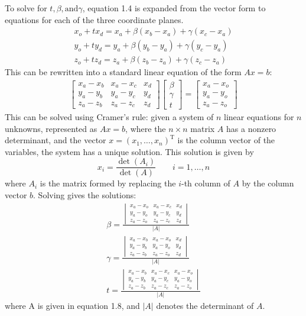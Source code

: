 To solve for $t, \beta, \text{and} \gamma$, equation 1.4 is expanded from the vector form to equations for each of the three coordinate planes.
\begin{align}
x_o + tx_d = x_a + \beta(x_b-x_a) + \gamma(x_c-x_a) \\
y_o + ty_d = y_a + \beta(y_b-y_a) + \gamma(y_c-y_a) \\
z_o + tz_d = z_a + \beta(z_b-z_a) + \gamma(z_c-z_a)
\end{align}
This can be rewritten into a standard linear equation of the form $Ax = b$:
\begin{align}
\begin{bmatrix}
x_a - x_b & x_a - x_c & x_d \\
y_a - y_b & y_a - y_c & y_d \\
z_a - z_b & z_a - z_c & z_d
\end{bmatrix}
\begin{bmatrix}
\beta \\ \gamma \\ t
\end{bmatrix}
= \begin{bmatrix}
x_a - x_o \\ y_a - y_o \\ z_a - z_o
\end{bmatrix}
\end{align}
This can be solved using Cramer's rule: given a system of $n$ linear equations for $n$ unknowns, represented as $Ax = b$, where the $n \times n$ matrix $A$ has a nonzero determinant, and the vector $x = (x_1, \ldots, x_n)^\mathrm{T}$ is the column vector of the variables, the system has a unique solution.
This solution is given by
\begin{equation}
x_i = \frac{\det(A_i)}{\det(A)} \qquad i = 1, \ldots, n
\end{equation}
where  $A_i$  is the matrix formed by replacing the $i$-th column of $A$ by the column vector $b$.
Solving gives the solutions:
\begin{align}
\beta = \frac{\begin{vmatrix}
x_a - x_o & x_a - x_c & x_d \\
y_a - y_o & y_a - y_c & y_d \\
z_a - z_o & z_a - z_c & z_d
\end{vmatrix}}{|A|} \\
\gamma = \frac{\begin{vmatrix}
x_a - x_b & x_a - x_o & x_d \\
y_a - y_b & y_a - y_o & y_d \\
z_a - z_b & z_a - z_o & z_d
\end{vmatrix}}{|A|} \\
t = \frac{\begin{vmatrix}
x_a - x_b & x_a - x_c & x_a - x_o \\
y_a - y_b & y_a - y_c & y_a - y_o \\
z_a - z_b & z_a - z_c & z_a - z_o
\end{vmatrix}}{|A|} 
\end{align}
where A is given in equation 1.8, and $|A|$ denotes the determinant of $A$.

